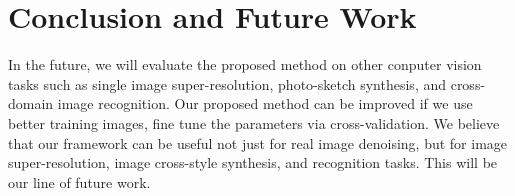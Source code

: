 \documentclass[10pt,twocolumn,letterpaper]{article}
\begin{document}
\section{Conclusion and Future Work}

In the future, we will evaluate the proposed method on other conputer vision tasks such as single image super-resolution, photo-sketch synthesis, and cross-domain image recognition. Our proposed method can be improved if we use better training images, fine tune the parameters via cross-validation. We believe that our framework can be useful not just for real image denoising, but for image super-resolution, image cross-style synthesis, and recognition tasks. This will be our line of future work.

{
\small


}
\end{document}
